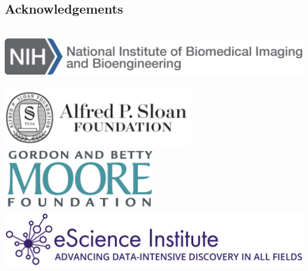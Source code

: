 \documentclass[a0, landscape]{a0poster}
\begin{document}
\begin{multicols}{3}

\nocite{*} %
\footnotesize  %

\subsection*{Acknowledgements} \footnotesize


\includegraphics[height=2.6cm]{NIBIB.png}\\
\includegraphics[height=2.6cm]{SloanLogo.png}
\includegraphics[height=2.6cm]{MooreFdn.png}
\includegraphics[height=2.6cm]{eSciencelogo.png}

\end{multicols}
\end{document}
